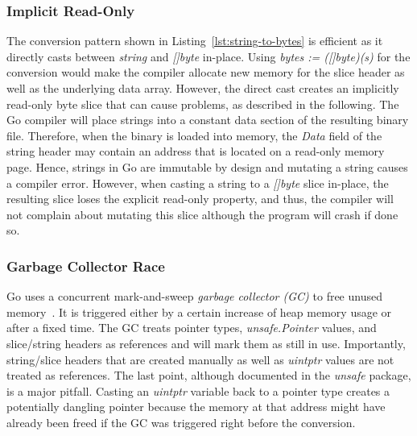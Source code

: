 \subsubsection*{Implicit Read-Only}

The conversion pattern shown in Listing~\ref{lst:string-to-bytes} is efficient as it directly casts between \textit{string} and \textit{[]byte} in-place. %
Using \textit{bytes := ([]byte)(s)} for the conversion would make the compiler allocate new memory for the slice header as well as the underlying data array.
However, the direct cast creates an implicitly read-only byte slice that can cause problems, as described in the following.
The Go compiler will place strings into a constant data section of the resulting binary file.
Therefore, when the binary is loaded into memory, the \textit{Data} field of the string header may contain an address that is located on a read-only memory page.
Hence, strings in Go are immutable by design and mutating a string causes a compiler error. %
However, when casting a string to a \textit{[]byte} slice in-place, the resulting slice loses the explicit read-only property, and thus, the compiler will not complain about mutating this slice although the program will crash if done so.


\subsubsection*{Garbage Collector Race}

Go uses a concurrent mark-and-sweep \textit{garbage collector (GC)} to free unused memory~\cite{sibiryov2017}.
It is triggered either by a certain increase of heap memory usage or after a fixed time. %
The GC treats pointer types, \textit{unsafe.Pointer} values, and slice/string headers as references and will mark them as still in use. %
Importantly, string/slice headers that are created manually as well as \textit{uintptr} values are not treated as references.
The last point, although documented in the \textit{unsafe} package, is a major pitfall.
Casting an \textit{uintptr} variable back to a pointer type creates a potentially dangling pointer because the memory at that address might have already been freed if the GC was triggered right before the conversion.

